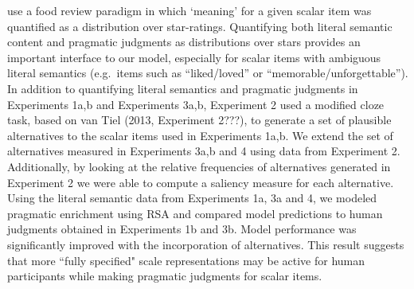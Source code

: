 \documentclass[10pt, letterpaper]{article}
\begin{document}
use a food review paradigm in which `meaning' for a given scalar item
was quantified as a distribution over star-ratings. Quantifying both
literal semantic content and pragmatic judgments as distributions over
stars provides an important interface to our model, especially for
scalar items with ambiguous literal semantics (e.g.~items such as
``liked/loved'' or ``memorable/unforgettable''). In addition to
quantifying literal semantics and pragmatic judgments in Experiments
1a,b and Experiments 3a,b, Experiment 2 used a modified cloze task,
based on van Tiel (2013, Experiment 2???), to generate a set of
plausible alternatives to the scalar items used in Experiments 1a,b. We
extend the set of alternatives measured in Experiments 3a,b and 4 using
data from Experiment 2. Additionally, by looking at the relative
frequencies of alternatives generated in Experiment 2 we were able to
compute a saliency measure for each alternative. Using the literal
semantic data from Experiments 1a, 3a and 4, we modeled pragmatic
enrichment using RSA and compared model predictions to human judgments
obtained in Experiments 1b and 3b. Model performance was significantly
improved with the incorporation of alternatives. This result suggests
that more ``fully specified" scale representations may be active for
human participants while making pragmatic judgments for scalar items.
\end{document}
